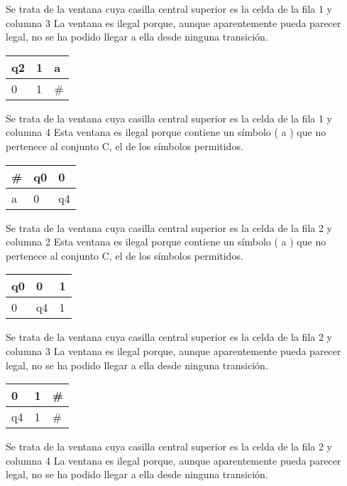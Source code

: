 ﻿\documentclass[a4paper,10pt]{article}
\begin{document}
Se trata de la ventana cuya casilla central superior es la celda de la fila 1 y columna 3\newline
La ventana es ilegal porque, aunque aparentemente pueda parecer legal, no se ha podido llegar a ella desde ninguna transición.\newline
\begin{table}[h!]
\centering
\begin{tabular}{|l|l|l|}
\hline
	q2  &   1   &   a	\\ \hline
	0   &   1   &   \#	\\ \hline
\end{tabular}
\end{table}

Se trata de la ventana cuya casilla central superior es la celda de la fila 1 y columna 4\newline
Esta ventana es ilegal porque contiene un símbolo ( a ) que no pertenece al conjunto C, el de los símbolos permitidos.
\newline
\begin{table}[h!]
\centering
\begin{tabular}{|l|l|l|}
\hline
	\#  &   q0  &   0	\\ \hline
	a   &   0   &   q4	\\ \hline
\end{tabular}
\end{table}

Se trata de la ventana cuya casilla central superior es la celda de la fila 2 y columna 2\newline
Esta ventana es ilegal porque contiene un símbolo ( a ) que no pertenece al conjunto C, el de los símbolos permitidos.
\newline
\begin{table}[h!]
\centering
\begin{tabular}{|l|l|l|}
\hline
	q0  &   0   &   1	\\ \hline
	0   &   q4  &   1	\\ \hline
\end{tabular}
\end{table}

Se trata de la ventana cuya casilla central superior es la celda de la fila 2 y columna 3\newline
La ventana es ilegal porque, aunque aparentemente pueda parecer legal, no se ha podido llegar a ella desde ninguna transición.\newline
\begin{table}[h!]
\centering
\begin{tabular}{|l|l|l|}
\hline
	0   &   1   &   \#	\\ \hline
	q4  &   1   &   \#	\\ \hline
\end{tabular}
\end{table}

Se trata de la ventana cuya casilla central superior es la celda de la fila 2 y columna 4\newline
La ventana es ilegal porque, aunque aparentemente pueda parecer legal, no se ha podido llegar a ella desde ninguna transición.\newline
\end{document}
